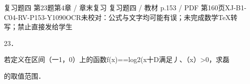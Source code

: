 \begin{bankitem}{复习题四 第23题}{第4章 / 章末复习 复习题四 / 教材 p.153 / PDF 第160页}{XJ-B1-C04-RV-P153-Y1090}{OCR未校对：公式与文字均可能有误；未完成数学TeX转写；禁止直接发给学生}
\begin{ocrdraft}
\par
23．
\par
若定义在区间（一1，0）上的函数f(x)==log2(x十D满足丿、（x）>0，求磊
\par
的取值范围．
\end{ocrdraft}
\end{bankitem}

